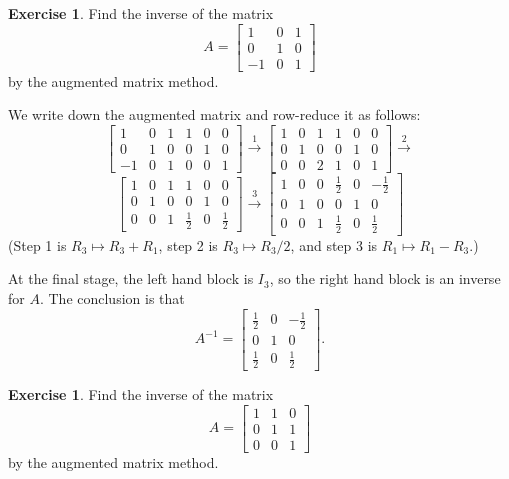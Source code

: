 \documentclass[a4paper]{book}
\newcommand{\bbm}       {\begin{bmatrix}}
\newcommand{\ebm}       {\end{bmatrix}}
\newcommand{\xra}       {\xrightarrow}
\renewcommand{\:}{\colon}
\theoremstyle{definition}
\newtheorem{exercise}[theorem]{Exercise}
\renewenvironment{solution}{\SolutionInline}{\endSolutionInline}
\begin{document}
\begin{exercise}
 Find the inverse of the matrix
 \[ A = \bbm 1&0&1\\ 0&1&0\\ -1&0&1 \ebm \]
 by the augmented matrix method.
\end{exercise}
\begin{solution}
 We write down the augmented matrix and row-reduce it as follows:
 {\newcommand{\h}{\tfrac{1}{2}}\small 
  \[
   \left[\begin{array}{ccc|ccc}
     1& 0& 1 &  1& 0& 0 \\
     0& 1& 0 &  0& 1& 0 \\
    -1& 0& 1 &  0& 0& 1
   \end{array}\right] \xra{1}
   \left[\begin{array}{ccc|ccc}
     1& 0& 1 &  1& 0& 0 \\
     0& 1& 0 &  0& 1& 0 \\
     0& 0& 2 &  1& 0& 1
   \end{array}\right] \xra{2}
  \] \[
   \left[\begin{array}{ccc|ccc}
     1& 0& 1 &  1& 0& 0 \\
     0& 1& 0 &  0& 1& 0 \\
     0& 0& 1 & \h& 0&\h
   \end{array}\right] \xra{3}
   \left[\begin{array}{ccc|ccc}
     1& 0& 0 & \h& 0&-\h \\
     0& 1& 0 &  0& 1& 0 \\
     0& 0& 1 & \h& 0&\h
   \end{array}\right]
  \]}
 (Step 1 is $R_3\mapsto R_3+R_1$, step 2 is $R_3\mapsto R_3/2$, and
 step 3 is $R_1\mapsto R_1-R_3$.)

 At the final stage, the left hand block is $I_3$, so the right hand
 block is an inverse for $A$.  The conclusion is that 
 \[ A^{-1} =
     \bbm \tfrac{1}{2} & 0 & -\tfrac{1}{2} \\
          0            & 1 & 0             \\
          \tfrac{1}{2} & 0 & \tfrac{1}{2} \ebm.
 \]
\end{solution}
\begin{exercise}
 Find the inverse of the matrix
 \[ A = \bbm 1&1&0\\ 0&1&1\\ 0&0&1 \ebm \]
 by the augmented matrix method.
\end{exercise}
\end{document}
